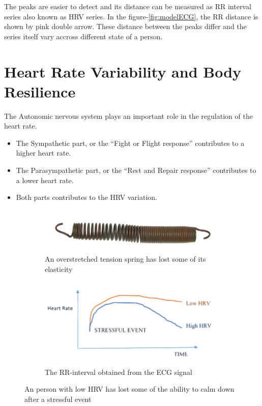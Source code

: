 \documentclass[a4paper, 11pt]{report}\usepackage[]{graphicx}\usepackage[]{color}
\numberwithin{figure}{section}
\begin{document}
The peaks are easier to detect and its distance can be measured as RR interval series also known as HRV series. In the figure-\ref{fig:modelECG}, the RR distance is shown by pink double arrow. These distance between the peaks differ and the series itself vary accross different state of a person.
\section{Heart Rate Variability and Body Resilience}
The Autonomic nervous system plays an important role in the regulation of the heart rate.

\begin{itemize}
\item The Sympathetic part, or the ``Fight or Flight response'' contributes to a higher heart rate.
\item The Parasympathetic part, or the “Rest and Repair response” contributes to a lower heart rate.
\item Both parts contributes to the HRV variation.
\end{itemize}

\begin{figure}[H]
\centering
\begin{subfigure}[t]{0.47\textwidth}
  \includegraphics[width = \textwidth]{figure/Spring}
  \caption{An overstretched tension spring has lost some of its elasticity}
\end{subfigure}
\begin{subfigure}[t]{0.47\textwidth}
  \includegraphics[width = \textwidth]{figure/hvr_low_high}
  \caption{The RR-interval obtained from the ECG signal}
\end{subfigure}
\caption{An person with low HRV has lost some of the ability to calm down after a stressful event}
\label{fig:hrProperties}
\end{figure}
\end{document}
